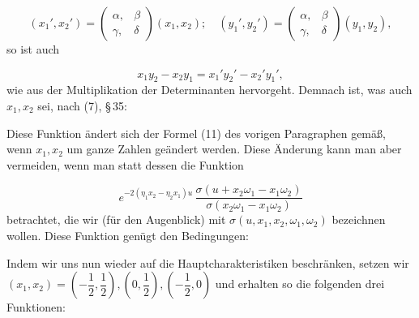 \[
(x_1', x_2') = \begin{pmatrix}\alpha, & \beta\\ \gamma, & \delta\end{pmatrix}(x_1, x_2); \quad (y_1', y_2') = \begin{pmatrix}\alpha, & \beta\\ \gamma, & \delta\end{pmatrix}(y_1, y_2),
\]
so ist auch

\[
x_1 y_2 - x_2 y_1 = x_1' y_2' - x_2' y_1',
\]
wie aus der Multiplikation der Determinanten hervorgeht. Demnach ist, was auch $x_1, x_2$ sei, nach (7), \S\,35:

Diese Funktion ändert sich der Formel (11) des vorigen Paragraphen gemäß, wenn $x_1, x_2$ um ganze Zahlen geändert werden. Diese Änderung kann man aber vermeiden, wenn man statt dessen die Funktion

\[
e^{-2(\eta_1 x_2 - \eta_2 x_1)u}\, \frac{\sigma(u + x_2\omega_1 - x_1\omega_2)}{\sigma(x_2\omega_1 - x_1\omega_2)}
\]
betrachtet, die wir (für den Augenblick) mit $\sigma(u, x_1, x_2, \omega_1, \omega_2)$ bezeichnen wollen. Diese Funktion genügt den Bedingungen:




Indem wir uns nun wieder auf die Hauptcharakteristiken beschränken, setzen wir $(x_1, x_2) = \left(-\dfrac{1}{2}, \dfrac{1}{2}\right), \left(0, \dfrac{1}{2}\right), \left(-\dfrac{1}{2}, 0\right)$ und erhalten so die folgenden drei Funktionen:

